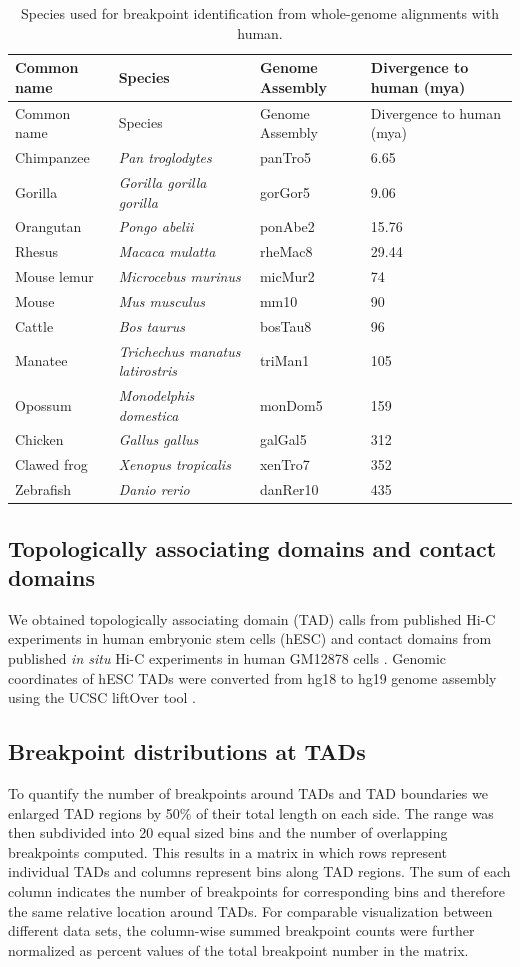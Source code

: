 \documentclass[a4paper,twoside=true,openright,parskip=full,chapterprefix=true,11pt,headings=normal,bibliography=totoc,listof=totoc,titlepage=on,captions=tableabove,draft=false]{scrreprt}
\theoremstyle{definition}
\theoremstyle{definition}
\theoremstyle{definition}
\theoremstyle{remark}
\begin{document}
\begin{longtable}[]{@{}llll@{}}
\caption{\label{tab:TadEvoSpecies} Species used for breakpoint
identification from whole-genome alignments with human. }\tabularnewline
\toprule
Common name & Species & Genome Assembly & Divergence to human
(mya)\tabularnewline
\midrule
\endfirsthead
\toprule
Common name & Species & Genome Assembly & Divergence to human
(mya)\tabularnewline
\midrule
\endhead
Chimpanzee & \emph{Pan troglodytes} & panTro5 & 6.65\tabularnewline
Gorilla & \emph{Gorilla gorilla gorilla} & gorGor5 & 9.06\tabularnewline
Orangutan & \emph{Pongo abelii} & ponAbe2 & 15.76\tabularnewline
Rhesus & \emph{Macaca mulatta} & rheMac8 & 29.44\tabularnewline
Mouse lemur & \emph{Microcebus murinus} & micMur2 & 74\tabularnewline
Mouse & \emph{Mus musculus} & mm10 & 90\tabularnewline
Cattle & \emph{Bos taurus} & bosTau8 & 96\tabularnewline
Manatee & \emph{Trichechus manatus latirostris} & triMan1 &
105\tabularnewline
Opossum & \emph{Monodelphis domestica} & monDom5 & 159\tabularnewline
Chicken & \emph{Gallus gallus} & galGal5 & 312\tabularnewline
Clawed frog & \emph{Xenopus tropicalis} & xenTro7 & 352\tabularnewline
Zebrafish & \emph{Danio rerio} & danRer10 & 435\tabularnewline
\bottomrule
\end{longtable}

\subsection{Topologically associating domains and contact
domains}\label{topologically-associating-domains-and-contact-domains}

We obtained topologically associating domain (TAD) calls from published
Hi-C experiments in human embryonic stem cells (hESC) \citep{Dixon2012}
and contact domains from published \emph{in situ} Hi-C experiments in
human GM12878 cells \citep{Rao2014}. Genomic coordinates of hESC TADs
were converted from hg18 to hg19 genome assembly using the UCSC liftOver
tool \citep{Hinrichs2006}.

\subsection{Breakpoint distributions at
TADs}\label{breakpoint-distributions-at-tads}

To quantify the number of breakpoints around TADs and TAD boundaries we
enlarged TAD regions by 50\% of their total length on each side. The
range was then subdivided into 20 equal sized bins and the number of
overlapping breakpoints computed. This results in a matrix in which rows
represent individual TADs and columns represent bins along TAD regions.
The sum of each column indicates the number of breakpoints for
corresponding bins and therefore the same relative location around TADs.
For comparable visualization between different data sets, the
column-wise summed breakpoint counts were further normalized as percent
values of the total breakpoint number in the matrix.
\end{document}
